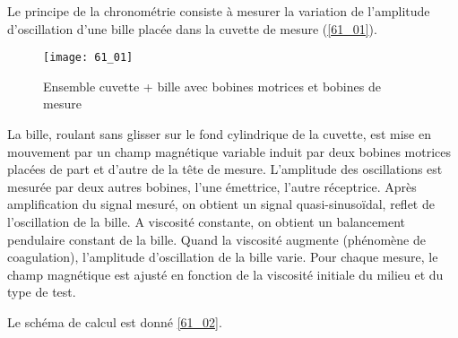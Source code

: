 \normaltrue
\correctionfalse


\setcounter{question}{0}%
\ifcorrection
\else
{}
\fi


\ifprof
\else
Le principe de la chronométrie consiste à mesurer la variation de l’amplitude d’oscillation d’une
bille placée dans la cuvette de mesure (\autoref{61_01}).%

\begin{figure}[H]
\centering
\texttt{[image: 61\_01]}
\caption{\label{61_01} Ensemble cuvette + bille avec bobines motrices et bobines de mesure}
\end{figure}

La bille, roulant sans glisser sur le fond cylindrique de la cuvette, est mise en mouvement par un
champ magnétique variable induit par deux bobines motrices placées de part et d’autre de la tête de
mesure.
L’amplitude des oscillations est mesurée par deux autres bobines, l’une émettrice, l’autre réceptrice.
Après amplification du signal mesuré, on obtient un signal quasi-sinusoïdal, reflet de l’oscillation
de la bille. A viscosité constante, on obtient un balancement pendulaire constant de la bille. Quand
la viscosité augmente (phénomène de coagulation), l’amplitude d’oscillation de la bille varie.
Pour chaque mesure, le champ magnétique est ajusté en fonction de la viscosité initiale du milieu et
du type de test.



Le schéma de calcul est donné \autoref{61_02}.


